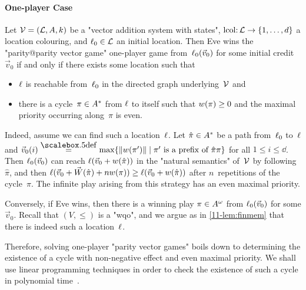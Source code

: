 \paragraph{One-player Case}
Let $\mathcal V=(\mathcal L,A,k)$ be a "vector addition system with states",
$\mathrm{lcol}{:}\,\mathcal L\to\{1,\dots,d\}$ a location colouring, and
$\ell_0\in\mathcal L$ an initial location.  Then Eve wins the
"parity@parity vector game" one-player game from~$\ell_0(\vec v_0)$
for some initial credit~$\vec v_0$ if and only if there exists some
location such that
\begin{itemize}
\item $\ell$ is reachable from~$\ell_0$ in the directed graph
  underlying~$\mathcal V$ and
\item there is a cycle~$\pi\in A^\ast$ from $\ell$ to itself such
  that $w(\pi)\geq 0$ and the maximal priority occurring
  along~$\pi$ is even.
\end{itemize}
Indeed, assume we can find such a location~$\ell$.  Let
$\hat\pi\in A^\ast$ be a path from~$\ell_0$ to~$\ell$ and $\vec
v_0(i)\eqdef\max\{\|\weight(\pi')\|\mid\pi'\text{ is a prefix of
}\hat\pi\pi\}$ for all $1\leq i\leq\dd$.  Then $\ell_0(\vec v_0)$ can
reach $\ell(\vec v_0+w(\hat\pi))$ in the "natural semantics"
of~$\mathcal V$ by following~$\hat\pi$, and then $\ell(\vec v_0+\vec
W(\hat\pi)+nw(\pi))\geq \ell(\vec v_0+w(\hat\pi))$ after
$n$~repetitions of the cycle~$\pi$.  The infinite play arising from
this strategy has an even maximal priority.

Conversely, if Eve wins, then there is a winning play
$\pi\in A^\omega$ from $\ell_0(\vec v_0)$ for some $\vec v_0$.
Recall that $(V,{\leq})$ is a "wqo", and we argue as in
\cref{11-lem:finmem} that there is indeed such a location~$\ell$.

\medskip
Therefore, solving one-player "parity vector games" boils down to
determining the existence of a cycle with non-negative effect and even
maximal priority.  We shall use linear programming techniques in order
to check the existence of such a cycle in polynomial
time~\cite{Kosaraju&Sullivan:1988}.

